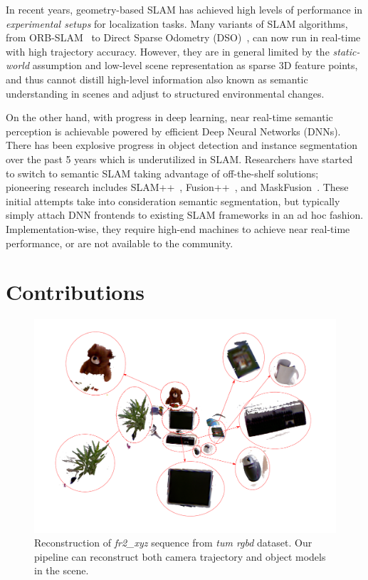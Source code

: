 In recent years, geometry-based SLAM has achieved high levels of performance in \textit{experimental setups} for localization tasks. Many variants of SLAM algorithms, from ORB-SLAM~\cite{mur-artalORBSLAM2OpenSourceSLAM2017} to Direct Sparse Odometry (DSO)~\cite{engelDirectSparseOdometry2018}, can now run in real-time with high trajectory accuracy. However, they are in general limited by the \emph{static-world} assumption and low-level scene representation as sparse 3D feature points, and thus cannot distill high-level information also known as semantic understanding in scenes and adjust to structured environmental changes.

On the other hand, with progress in deep learning, near real-time semantic perception is achievable powered by efficient Deep Neural Networks (DNNs). There has been explosive progress in object detection and instance segmentation over the past 5 years \cite{renFasterRCNNRealTime2016, heMaskRCNN2018, redmonYouOnlyLook2016} which is underutilized in SLAM. Researchers have started to switch to semantic SLAM taking advantage of off-the-shelf solutions; pioneering research includes SLAM++~\cite{salas-morenoSLAMSimultaneousLocalisation2013}, Fusion++~\cite{mccormacFusionVolumetricObjectLevel2018}, and MaskFusion~\cite{runzMaskFusionRealTimeRecognition2018}. These initial attempts take into consideration semantic segmentation, but typically simply attach DNN frontends to existing SLAM frameworks in an ad hoc fashion. Implementation-wise, they require high-end machines to achieve near real-time performance, or are not available to the community.

\section{Contributions}

\begin{figure}[htbp]
    \centering
    \includegraphics[width=\linewidth]{figs/teaser.pdf}\vspace{-1cm}
    \caption{Reconstruction of \textit{fr2\_xyz} sequence from \emph{tum rgbd} dataset. Our pipeline can reconstruct both camera trajectory and object models in the scene.}
    \label{fig:objectsandscene}
\end{figure}

